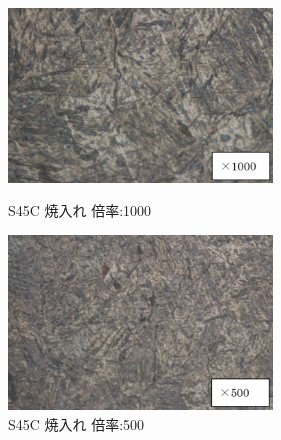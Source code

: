 \documentclass[10pt，a4j]{jsarticle}
\begin{document}
  \begin{figure}[htbp]
    \begin{minipage}{0.5\hsize}
      \begin{center}
        \includegraphics[width=7cm]{../img/S45C_yakiire_1000.png}
        \caption{S45C 焼入れ 倍率:1000}
      \end{center}
    \end{minipage}
    \begin{minipage}{0.5\hsize}
      \begin{center}
        \includegraphics[width=7cm]{../img/S45C_yakiire_500.png}
        \caption{S45C 焼入れ 倍率:500}
      \end{center}
    \end{minipage}
  \end{figure}
\end{document}
